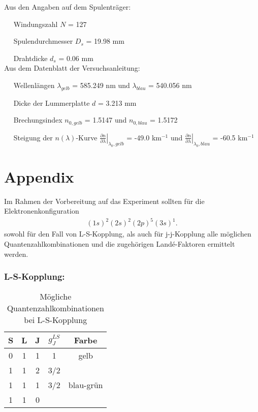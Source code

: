 \documentclass[a4paper,parskip,11pt, DIV12]{scrreprt}
\begin{document}
	Aus den Angaben auf dem Spulenträger:
	
$\quad$ Windungszahl $N$ = 127

$\quad$ Spulendurchmesser $D_s$ = 19.98 mm
 
$\quad$ Drahtdicke $d_s$ = 0.06 mm \\



	Aus dem Datenblatt der Versuchsanleitung:
	
$\quad$ Wellenlängen $\lambda_{gelb}$ = 585.249 nm und $\lambda_{blau}$ = 540.056 nm

$\quad$ Dicke der Lummerplatte $d$ = 3.213 mm

$\quad$ Brechungsindex $n_{0,gelb}$ = 1.5147 und $n_{0,blau}$ = 1.5172

$\quad$ Steigung der $n(\lambda)$-Kurve $\left.\frac{\partial n}{\partial \lambda}\right|_{\lambda_0,gelb}$ = -49.0 km$^{-1}$ und $\left.\frac{\partial n}{\partial \lambda}\right|_{\lambda_0,blau}$ = -60.5 km$^{-1}$


	\chapter{Appendix}
	\label{ch:Appendix}
		
	Im Rahmen der Vorbereitung auf das Experiment sollten für die Elektronenkonfiguration \begin{align*}
		(1s)^2(2s)^2(2p)^5(3s)^1.
		\end{align*} sowohl für den Fall von L-S-Kopplung, als auch für j-j-Kopplung alle möglichen Quantenzahlkombinationen und die zugehörigen Landé-Faktoren ermittelt werden.
	
	\subsection*{L-S-Kopplung:}
	
	\begin{table}[H]
	\centering
	\begin{tabular}{|c|c|c|c|c|}
	\hline 
S & L & J & $g_J^{LS}$ & Farbe	\\
\hline \hline
0 & 1 & 1 & 1 & gelb	\\
\hline
1 & 1 & 2 & 3/2 &	\\
	\hline
1 & 1 & 1 & 3/2 & blau-grün	\\
	\hline
1 & 1 & 0 &  &	\\
	\hline
	\end{tabular} 
	\caption{Mögliche Quantenzahlkombinationen bei L-S-Kopplung}
	\end{table}	
	
\end{document}

